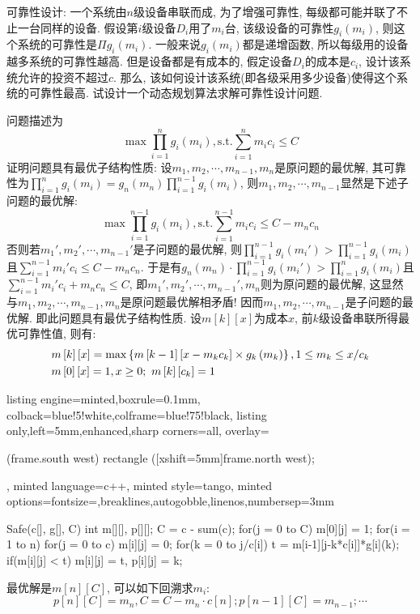 \documentclass{article}
\begin{document}
\begin{homeworkProblem}
	可靠性设计: 一个系统由$n$级设备串联而成, 为了增强可靠性, 每级都可能并联了不止一台同样的设备. 假设第$i $级设备$D_i$用了$m_i$台, 该级设备的可靠性$g_i(m_i)$, 则这个系统的可靠性是$\Pi g_i(m_i)$. 一般来说$g_i(m_i)$都是递增函数, 所以每级用的设备越多系统的可靠性越高. 但是设备都是有成本的, 假定设备$D_i$的成本是$c_i$, 设计该系统允许的投资不超过$c$. 那么, 该如何设计该系统(即各级采用多少设备)使得这个系统的可靠性最高. 试设计一个动态规划算法求解可靠性设计问题.

	\solution 问题描述为
	$$\max \prod_{i=1}^n{g_i\left( m_i \right)}, \text{s.t.} \sum_{i=1}^n{m_ic_i}\le C
	$$
	证明问题具有最优子结构性质: 设$m_1,m_2,\cdots,m_{n-1},m_n$是原问题的最优解, 其可靠性为$\displaystyle \prod_{i=1}^n{g_i\left( m_i \right)}=g_n\left( m_n \right) \prod_{i=1}^{n-1}{g_i\left( m_i \right)}	$, 则$m_1,m_2,\cdots,m_{n-1}$显然是下述子问题的最优解:$$\max \prod_{i=1}^{n-1}{g_i\left( m_i \right)}, \text{s.t.} \sum_{i=1}^{n-1}{m_ic_i}\le C-m_nc_n
	$$
	否则若$m_1',m_2',\cdots,m_{n-1}'$是子问题的最优解, 则$\displaystyle \prod_{i=1}^{n-1}{g_i\left( m_i' \right)}>\prod_{i=1}^{n-1}{g_i\left( m_i \right)}	$且$\displaystyle \sum_{i=1}^{n-1}{m_i'c_i}\le C-m_nc_n$. 于是有$\displaystyle g_n\left( m_n \right) \cdot \prod_{i=1}^{n-1}{g_i\left( m_i' \right)}>\prod_{i=1}^n{g_i\left( m_i \right)}$且$\displaystyle \sum_{i=1}^{n-1}{m_i'c_i}+m_nc_n\le C	$, 即$m_1',m_2',\cdots,m_{n-1}',m_n$则为原问题的最优解, 这显然与$m_1,m_2,\cdots,m_{n-1},m_n$是原问题最优解相矛盾! 因而$m_1,m_2,\cdots,m_{n-1}$是子问题的最优解. 即此问题具有最优子结构性质. 设$m[k][x]$为成本$x$, 前$k$级设备串联所得最优可靠性值, 则有:
	\begin{align}
		&m\left[ k \right] \left[ x \right] =\max \left\{ m\left[ k-1 \right] \left[ x-m_kc_k \right] \times g_k\left( m_k \right) \right\} ,1\le m_k\le x/c_k \notag
		\\
		&m\left[ 0 \right] \left[ x \right] =1,x\ge 0;\,\, m\left[ k \right] \left[ c_k \right] =1 \notag
	\end{align}
\begin{tcblisting}{listing engine=minted,boxrule=0.1mm,
colback=blue!5!white,colframe=blue!75!black,
listing only,left=5mm,enhanced,sharp corners=all,
overlay={\begin{tcbclipinterior} (frame.south west)
rectangle ([xshift=5mm]frame.north west);\end{tcbclipinterior}},
minted language=c++,
minted style=tango,
minted options={fontsize=\small,breaklines,autogobble,linenos,numbersep=3mm}}
Safe(c[], g[], C) {
    int m[][], p[][];
    C = c - sum(c);
    for(j = 0 to C) m[0][j] = 1;
    for(i = 1 to n) {
        for(j = 0 to c) {
            m[i][j] = 0;
            for(k = 0 to j/c[i]) {
                t = m[i-1][j-k*c[i]]*g[i](k);
                if(m[i][j] < t) {
                    m[i][j] = t, p[i][j] = k;
                }
            }
        }
    }
}
\end{tcblisting}
	最优解是$m[n][C]$, 可以如下回溯求$m_i$:$$p\left[ n \right] \left[ C \right] =m_n,C=C-m_n\cdot c\left[ n \right] ;p\left[ n-1 \right] \left[ C \right] =m_{n-1};\cdots 
	$$
	\newpage
\end{homeworkProblem}
\end{document}
